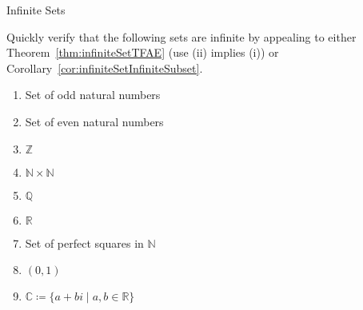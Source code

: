 \begin{section}{Infinite Sets}
\begin{problem}\label{prob:moreInfiniteSets}
Quickly verify that the following sets are infinite by appealing to either Theorem~\ref{thm:infiniteSetTFAE} (use (ii) implies (i)) or Corollary~\ref{cor:infiniteSetInfiniteSubset}.
\begin{enumerate}[label=\textrm{(\alph*)}]
\item Set of odd natural numbers
\item Set of even natural numbers
\item $\mathbb{Z}$
\item $\mathbb{N}\times \mathbb{N}$
\item $\mathbb{Q}$
\item $\mathbb{R}$
\item Set of perfect squares in $\mathbb{N}$
\item $(0,1)$
\item $\mathbb{C}\coloneqq \{a+bi\mid a,b\in\mathbb{R}\}$
\end{enumerate}
\end{problem}

\end{section}